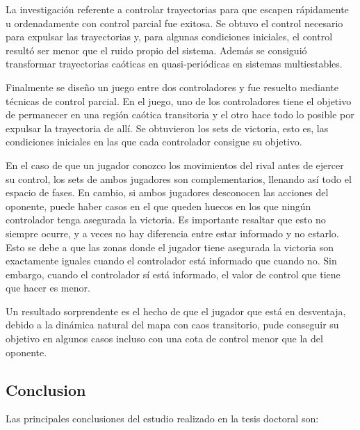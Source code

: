 La investigación referente a controlar trayectorias para que escapen rápidamente u ordenadamente con control parcial fue exitosa. Se obtuvo el control necesario para expulsar las trayectorias y, para algunas condiciones iniciales, el control resultó ser menor que el ruido propio del sistema. Además se consiguió transformar trayectorias caóticas en quasi-periódicas en sistemas multiestables.

Finalmente se diseño un juego entre dos controladores y fue resuelto mediante técnicas de control parcial. En el juego, uno de los controladores tiene el objetivo de permanecer en una región caótica transitoria y el otro hace todo lo posible por expulsar la trayectoria de allí. Se obtuvieron los sets de victoria, esto es, las condiciones iniciales en las que cada controlador consigue su objetivo.

En el caso de que un jugador conozco los movimientos del rival antes de ejercer su control, los sets de ambos jugadores son complementarios, llenando así todo el espacio de fases. En cambio, si ambos jugadores desconocen las acciones del oponente, puede haber casos en el que queden huecos en los que ningún controlador tenga asegurada la victoria. Es importante resaltar que esto no siempre ocurre, y a veces no hay diferencia entre estar informado y no estarlo. Esto se debe a que las zonas donde el jugador tiene asegurada la victoria son exactamente iguales cuando el controlador está informado que cuando no. Sin embargo, cuando el controlador sí está informado, el valor de control que tiene que hacer es menor.

Un resultado sorprendente es el hecho de que el jugador que está en desventaja, debido a la dinámica natural del mapa con caos transitorio, pude conseguir su objetivo en algunos casos incluso con una cota de control menor que la del oponente.

\subsection{Conclusion}

Las principales conclusiones del estudio realizado en la tesis doctoral son:

